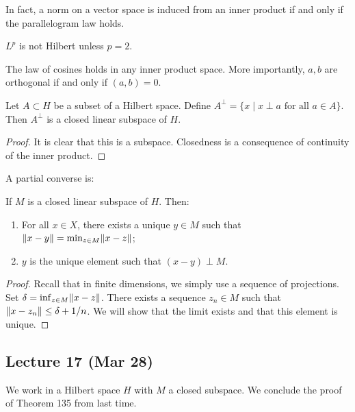 \documentclass[10pt, twoside]{article}
\begin{document}
    \begin{rmk} In fact, a norm on a vector space is induced from an inner
    product if and only if the parallelogram law holds.  \end{rmk}

    \begin{cor} $L^p$ is not Hilbert unless $p=2$.  \end{cor}

    The law of cosines holds in any inner product space. More importantly,
    $a,b$ are orthogonal if and only if $(a,b) = 0$.

    \begin{thm} Let $A \subset H$ be a subset of a Hilbert space. Define
        $A^{\perp} = \{x \mid x \perp a \text{ for all }a \in A\}$. Then
        $A^{\perp}$ is a closed linear subspace of $H$.  \begin{proof} It is
            clear that this is a subspace. Closedness is a consequence of
            continuity of the inner product.  \end{proof} \end{thm}

    A partial converse is: \begin{thm} If $M$ is a closed linear subspace of
        $H$. Then: \begin{enumerate} \item For all $x \in X$, there exists a
            unique $y \in M$ such that $\lVert x-y\rVert = \min_{z \in M}
            \lVert x-z\rVert$; \item $y$ is the unique element such that $(x-y) \perp
            M$.  \end{enumerate} \begin{proof} Recall that in finite
            dimensions, we simply use a sequence of projections. Set $\delta =
            \inf_{z \in M} \lVert x-z\rVert$. There exists a sequence $z_n \in M$
            such that $\lVert x-z_n\rVert \leq \delta + 1/n$. We will show that the
            limit exists and that this element is unique.  \end{proof}
        \end{thm}

    \subsection{Lecture 17 (Mar 28)}

    We work in a Hilbert space $H$ with $M$ a closed subspace. We conclude the
    proof of Theorem 135 from last time. 
\end{document}
